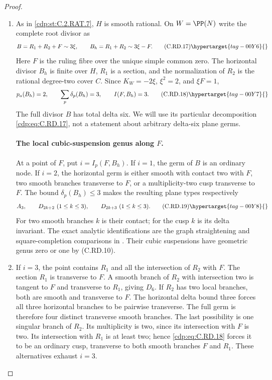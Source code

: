 \begin{proof}

\begin{enumerate}[label={$\langle1\rangle$\arabic*.},leftmargin=*]
\item As in \ref{cdp:st:C.2.RAT.7}, $H$ is smooth rational. On $W=\PP(N)$
write the complete root divisor as
\[
 B=R_1+R_2+F\sim3\xi,
 \qquad B_h=R_1+R_2\sim3\xi-F.
\tag{C.RD.17}\hypertarget{tag-00Y6}{}\label{cdp:eq:C.RD.17}
\]
Here $F$ is the ruling fibre over the unique simple
common zero. The horizontal divisor $B_h$ is finite
over $H$, $R_1$ is a section, and the normalization of
$R_2$ is the rational degree-two cover $C$.
Since $K_W=-2\xi$, $\xi^2=2$, and $\xi F=1$,
\[
 p_a(B_h)=2,
 \qquad \sum_p\delta_p(B_h)=3,
 \qquad I(F,B_h)=3.
\tag{C.RD.18}\hypertarget{tag-00Y7}{}\label{cdp:eq:C.RD.18}
\]
The full divisor $B$ has total delta six. We will
use its particular decomposition \eqref{cdp:eq:C.RD.17}, not a
statement about arbitrary delta-six plane germs.

\paragraph{The local cubic-suspension genus along $F$.}
At a point of $F$, put $i=I_p(F,B_h)$. If $i=1$,
the germ of $B$ is an ordinary node. If $i=2$,
the horizontal germ is either smooth with contact
two with $F$, two smooth branches transverse to
$F$, or a multiplicity-two cusp transverse to $F$.
The bound $\delta_p(B_h)\le3$ makes the resulting
plane types respectively
\[
 A_3,\qquad D_{2k+2}\ (1\le k\le3),\qquad
                 D_{2k+3}\ (1\le k\le3).
\tag{C.RD.19}\hypertarget{tag-00Y8}{}\label{cdp:eq:C.RD.19}
\]
For two smooth branches $k$ is their contact;
for the cusp $k$ is its delta invariant.
The exact analytic identifications are the graph
straightening and square-completion comparisons
in . Their cubic suspensions have
geometric genus zero or one by (C.RD.10).

\item If $i=3$, the point contains $R_1$ and all the
intersection of $R_2$ with $F$. The section $R_1$
is transverse to $F$. A smooth branch of $R_2$
with intersection two is tangent to $F$ and
transverse to $R_1$, giving $D_6$. If $R_2$ has
two local branches, both are smooth and transverse
to $F$. The horizontal delta bound three forces
all three horizontal branches to be pairwise
transverse. The full germ is therefore four
distinct transverse smooth branches.
The last possibility is one singular branch
of $R_2$. Its multiplicity is two, since its
intersection with $F$ is two. Its intersection
with $R_1$ is at least two; hence \eqref{cdp:eq:C.RD.18}
forces it to be an ordinary cusp, transverse
to both smooth branches $F$ and $R_1$.
These alternatives exhaust $i=3$.


\end{enumerate}
\end{proof}
